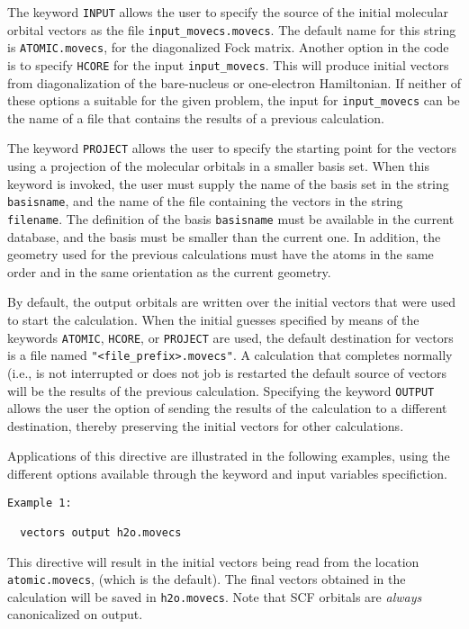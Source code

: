 The keyword \verb+INPUT+ allows the user to specify the source of the 
initial molecular orbital vectors as the file \verb+input_movecs.movecs+.  
The default name for this string is \verb+ATOMIC.movecs+, for the diagonalized
Fock matrix.  Another option in the code is to specify \verb+HCORE+ for
the input \verb+input_movecs+.  This will produce initial vectors from
diagonalization of the bare-nucleus or one-electron Hamiltonian.  If 
neither of these options a suitable for the given problem, the input
for \verb+input_movecs+ can be the name of a file that contains the
results of a previous calculation.

The keyword \verb+PROJECT+ allows the user to specify the starting point
for the vectors using a projection of the molecular orbitals in a smaller
basis set.  When this keyword is invoked, the user must supply the name
of the basis set in the string \verb+basisname+, and the name of the file 
containing the vectors in the string \verb+filename+.  The definition of 
the basis \verb+basisname+ 
must be available in the current database, and the basis must be
smaller than the current one.  In addition, the geometry used for the
previous calculations must have the atoms in the same order and in the
same orientation as the current geometry.
 
By default, the output orbitals are written over the initial vectors that
were used to start the calculation.  When the initial guesses specified
by means of the keywords \verb+ATOMIC+, \verb+HCORE+, or \verb+PROJECT+ 
are used, the default destination for
vectors is a file named \verb+"<file_prefix>.movecs"+.  A calculation 
that completes normally (i.e., is not interrupted or does not
job is restarted the default source of vectors will be the results 
of the previous calculation.  Specifying the keyword \verb+OUTPUT+ allows
the user the option of sending the results of the calculation to a different
destination, thereby preserving the initial vectors for other calculations.

Applications of this directive are illustrated in the following examples,
using the different options available through the keyword and input variables
specifiction.

\begin{verbatim}
Example 1:

  vectors output h2o.movecs
\end{verbatim}

This directive will result in the initial vectors being read from the 
location \verb+atomic.movecs+, (which is the default).  The final vectors 
obtained in the calculation
will be saved in \verb+h2o.movecs+.  Note that SCF orbitals are {\em always}
canonicalized on output.



